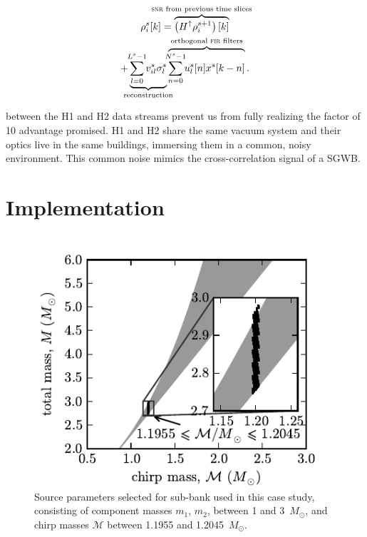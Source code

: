 \documentclass[portrait,plainboxedsections]{sciposter}
\begin{document}
\begin{multicols}{3}
\begin{multline}
	\rho_i^s [k] =%
		\overbrace{
			\left(H^\uparrow \rho_i^{s+1}\right)[k]
		}^\textrm{\clap{{\sc snr} from previous time slices}} \\
		+
		\underbrace{
			\sum_{\mathclap{l=0}}^{\mathclap{L^s-1}} v_{il}^s \sigma_l^s
		}_\textrm{\clap{reconstruction}}
		\overbrace{
			\sum_{\mathclap{n=0}}^{\mathclap{N^s-1}} u_l^s[n] x^s[k-n]
		}^\textrm{\clap{orthogonal {\sc fir} filters}} .
\end{multline}

 between the H1 and H2 data streams prevent us from
fully realizing the factor of 10 advantage promised. H1 and H2 share the same
vacuum system and their optics live in the same buildings, immersing them in
a common, noisy environment. This common noise mimics the cross-correlation
signal of a SGWB.

\columnbreak

\section{Implementation}

\begin{figure}[h]
	\includegraphics{figures/tmpltbank}
	\caption{\label{fig:tmpltbank}Source parameters selected for sub-bank used in this
case study, consisting of component masses $m_1$, $m_2$, between 1 and 3~$M_\odot$, and
chirp masses $\mathcal{M}$ between 1.1955 and 1.2045~$M_\odot$.}
\end{figure}


\end{multicols}
\end{document}
